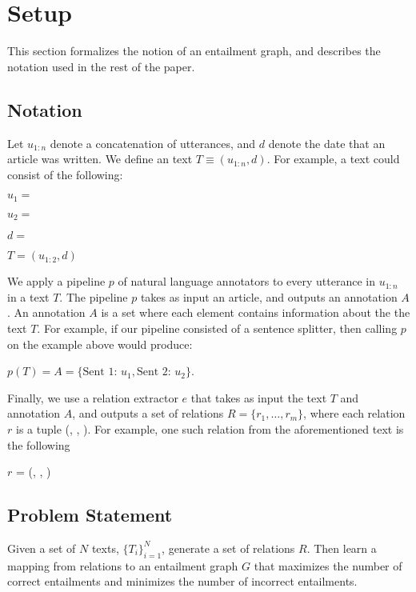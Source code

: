 \section{Setup}
This section formalizes the notion of an entailment graph, and describes
the notation used in the rest of the paper.
\subsection{Notation}
Let $u_{1:n}$ denote a concatenation of utterances, and 
$d$ denote the date that an article was written. We define
an text $T \equiv (u_{1:n}, d)$. For example, a text could consist
of the following:
\begin{description}
  \item $u_1 =$ 
  \item $u_2 =$ 
  \item $d =$  
  \item $T = (u_{1:2}, d)$
\end{description}

We apply a pipeline $p$ of natural language annotators 
to every utterance in $u_{1:n}$ in a text $T$. 
The pipeline $p$ takes as input an article, and outputs an annotation $A$.
An annotation $A$ is a set where each element contains
information about the the text $T$. For example, if our
pipeline consisted of a sentence splitter, then calling $p$
on the example above would produce:
\begin{center}
  $p(T) = A = \{\text{Sent 1: } u_1, \text{Sent 2: } u_2\}$.
\end{center}

Finally, we use a relation extractor $e$ that takes as input
the text $T$ and annotation $A$, and outputs a set of relations $R=\{r_1,\dots,r_m\}$,
where each relation $r$ is a tuple (, , ).
For example, one such relation from the aforementioned text is the following
\begin{center}
  $r$ = (, , )
\end{center}

\subsection{Problem Statement}
Given a set of $N$ texts, $\{T_i\}_{i=1}^{N}$, generate a set of 
relations $R$. Then learn a mapping
from relations to an entailment graph $G$ that maximizes the number of
correct entailments and minimizes the number of incorrect entailments.

